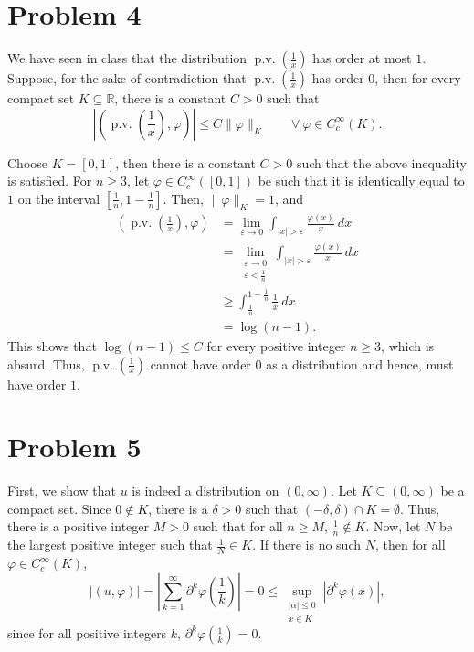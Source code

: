 \documentclass[10pt]{amsart}
\theoremstyle{thmstyle}
\theoremstyle{defstyle}
\newcommand{\R}{\mathbb{R}}
\renewcommand{\le}{\leqslant}
\renewcommand{\ge}{\geqslant}
\newcommand{\pv}{\operatorname{p.v.}}
\begin{document}
\section{Problem 4}

We have seen in class that the distribution $\pv\left(\frac{1}{x}\right)$ has order at most $1$. Suppose, for the sake of contradiction that $\pv\left(\frac{1}{x}\right)$ has order $0$, then for every compact set $K\subseteq\R$, there is a constant $C > 0$ such that 
\begin{equation*}
	\left|\left(\pv\left(\frac{1}{x}\right),\varphi\right)\right|\le C\|\varphi\|_K\qquad\forall~\varphi\in C_c^\infty(K).
\end{equation*}

Choose $K = [0, 1]$, then there is a constant $C > 0$ such that the above inequality is satisfied. For $n\ge 3$, let $\varphi\in C_c^\infty([0, 1])$ be such that it is identically equal to $1$ on the interval $\left[\frac{1}{n}, 1- \frac{1}{n}\right]$. Then, $\|\varphi\|_K = 1$, and 
\begin{align*}
	\left(\pv\left(\frac{1}{x}\right),\varphi\right) &= \lim_{\varepsilon\to 0}\int_{|x| > \varepsilon}\frac{\varphi(x)}{x}~dx\\
	&= \lim_{\substack{\varepsilon\to 0\\\varepsilon < \frac{1}{n}}}\int_{|x| > \varepsilon}\frac{\varphi(x)}{x}~dx\\
	&\ge\int_{\frac{1}{n}}^{1 - \frac{1}{n}}\frac{1}{x}~dx\\
	&= \log (n - 1).
\end{align*}
This shows that $\log (n - 1)\le C$ for every positive integer $n\ge 3$, which is absurd. Thus, $\pv\left(\frac{1}{x}\right)$ cannot have order $0$ as a distribution and hence, must have order $1$.

\section{Problem 5}

First, we show that $u$ is indeed a distribution on $(0, \infty)$. Let $K\subseteq(0,\infty)$ be a compact set. Since $0\notin K$, there is a $\delta > 0$ such that $(-\delta,\delta)\cap K = \emptyset$. Thus, there is a positive integer $M > 0$ such that for all $n\ge M$, $\frac{1}{n}\notin K$. Now, let $N$ be the largest positive integer such that $\frac{1}{N}\in K$. If there is no such $N$, then for all $\varphi\in C_c^\infty(K)$,
\begin{equation*}
	|(u, \varphi)| = \left|\sum_{k = 1}^\infty\partial^k\varphi\left(\frac{1}{k}\right)\right| = 0\le\sup_{\substack{|\alpha|\le 0\\ x\in K}}|\partial^k\varphi(x)|,
\end{equation*}
since for all positive integers $k$, $\partial^k\varphi\left(\frac{1}{k}\right) = 0$.
\end{document}

